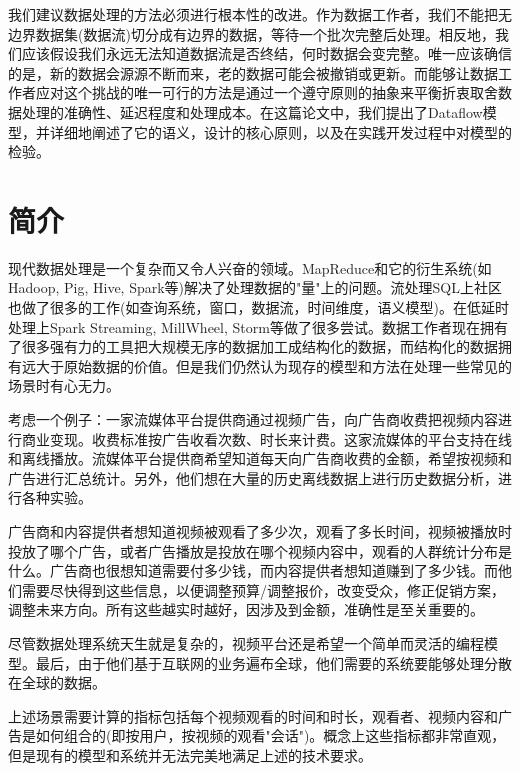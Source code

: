 \documentclass[oneside]{ctexbook}
\begin{document}
我们建议数据处理的方法必须进行根本性的改进。作为数据工作者，我们不能把无边界数据集(数据流)切分成有边界的数据，等待一个批次完整后处理。相反地，我们应该假设我们永远无法知道数据流是否终结，何时数据会变完整。唯一应该确信的是，新的数据会源源不断而来，老的数据可能会被撤销或更新。而能够让数据工作者应对这个挑战的唯一可行的方法是通过一个遵守原则的抽象来平衡折衷取舍数据处理的准确性、延迟程度和处理成本。在这篇论文中，我们提出了Dataflow模型，并详细地阐述了它的语义，设计的核心原则，以及在实践开发过程中对模型的检验。

\section{简介}

现代数据处理是一个复杂而又令人兴奋的领域。MapReduce和它的衍生系统(如Hadoop, Pig, Hive, Spark等)解决了处理数据的"量"上的问题。流处理SQL上社区也做了很多的工作(如查询系统，窗口，数据流，时间维度，语义模型)。在低延时处理上Spark Streaming, MillWheel, Storm等做了很多尝试。数据工作者现在拥有了很多强有力的工具把大规模无序的数据加工成结构化的数据，而结构化的数据拥有远大于原始数据的价值。但是我们仍然认为现存的模型和方法在处理一些常见的场景时有心无力。

考虑一个例子：一家流媒体平台提供商通过视频广告，向广告商收费把视频内容进行商业变现。收费标准按广告收看次数、时长来计费。这家流媒体的平台支持在线和离线播放。流媒体平台提供商希望知道每天向广告商收费的金额，希望按视频和广告进行汇总统计。另外，他们想在大量的历史离线数据上进行历史数据分析，进行各种实验。

广告商和内容提供者想知道视频被观看了多少次，观看了多长时间，视频被播放时投放了哪个广告，或者广告播放是投放在哪个视频内容中，观看的人群统计分布是什么。广告商也很想知道需要付多少钱，而内容提供者想知道赚到了多少钱。而他们需要尽快得到这些信息，以便调整预算/调整报价，改变受众，修正促销方案，调整未来方向。所有这些越实时越好，因涉及到金额，准确性是至关重要的。

尽管数据处理系统天生就是复杂的，视频平台还是希望一个简单而灵活的编程模型。最后，由于他们基于互联网的业务遍布全球，他们需要的系统要能够处理分散在全球的数据。

上述场景需要计算的指标包括每个视频观看的时间和时长，观看者、视频内容和广告是如何组合的(即按用户，按视频的观看"会话")。概念上这些指标都非常直观，但是现有的模型和系统并无法完美地满足上述的技术要求。
\end{document}
